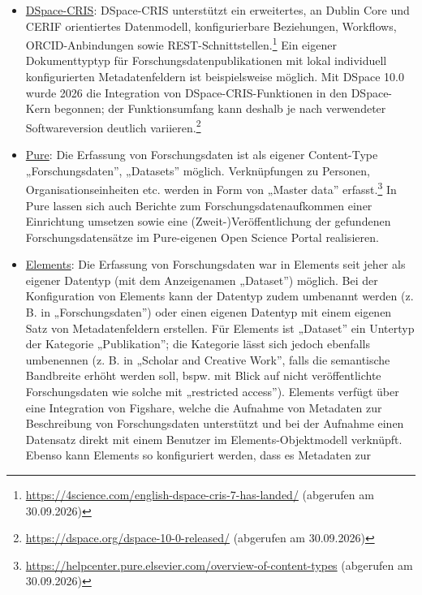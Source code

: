 \documentclass[
  ngerman,
  letterpaper,
  DIV=11]{scrreprt}
\providecommand{\tightlist}{%
  \setlength{\itemsep}{0pt}\setlength{\parskip}{0pt}}
\begin{document}
\begin{itemize}
\tightlist
\item
  \href{https://wiki.lyrasis.org/display/DSPACECRIS}{DSpace-CRIS}:
  DSpace-CRIS unterstützt ein erweitertes, an Dublin Core und CERIF
  orientiertes Datenmodell, konfigurierbare Beziehungen, Workflows,
  ORCID-Anbindungen sowie REST-Schnittstellen.\footnote{\url{https://4science.com/english-dspace-cris-7-has-landed/}
    (abgerufen am 30.09.2026)} Ein eigener Dokumenttyptyp für
  Forschungsdatenpublikationen mit lokal individuell konfigurierten
  Metadatenfeldern ist beispielsweise möglich. Mit DSpace 10.0 wurde
  2026 die Integration von DSpace-CRIS-Funktionen in den DSpace-Kern
  begonnen; der Funktionsumfang kann deshalb je nach verwendeter
  Softwareversion deutlich variieren.\footnote{\url{https://dspace.org/dspace-10-0-released/}
    (abgerufen am 30.09.2026)}
\item
  \href{https://www.elsevier.com/solutions/pure}{Pure}: Die Erfassung
  von Forschungsdaten ist als eigener Content-Type „Forschungsdaten'',
  „Datasets'' möglich. Verknüpfungen zu Personen, Organisationseinheiten
  etc. werden in Form von „Master data'' erfasst.\footnote{\url{https://helpcenter.pure.elsevier.com/overview-of-content-types}
    (abgerufen am 30.09.2026)} In Pure lassen sich auch Berichte zum
  Forschungsdatenaufkommen einer Einrichtung umsetzen sowie eine
  (Zweit-)Veröffentlichung der gefundenen Forschungsdatensätze im
  Pure-eigenen Open Science Portal realisieren.
\item
  \href{https://www.symplectic.co.uk/theelementsplatform/}{Elements}:
  Die Erfassung von Forschungsdaten war in Elements seit jeher als
  eigener Datentyp (mit dem Anzeigenamen „Dataset'') möglich. Bei der
  Konfiguration von Elements kann der Datentyp zudem umbenannt werden
  (z. B. in „Forschungsdaten'') oder einen eigenen Datentyp mit einem
  eigenen Satz von Metadatenfeldern erstellen. Für Elements ist
  „Dataset'' ein Untertyp der Kategorie „Publikation''; die Kategorie
  lässt sich jedoch ebenfalls umbenennen (z. B. in „Scholar and Creative
  Work'', falls die semantische Bandbreite erhöht werden soll, bspw. mit
  Blick auf nicht veröffentlichte Forschungsdaten wie solche mit
  „restricted access''). Elements verfügt über eine Integration von
  Figshare, welche die Aufnahme von Metadaten zur Beschreibung von
  Forschungsdaten unterstützt und bei der Aufnahme einen Datensatz
  direkt mit einem Benutzer im Elements-Objektmodell verknüpft. Ebenso
  kann Elements so konfiguriert werden, dass es Metadaten zur

\end{itemize}
\end{document}
